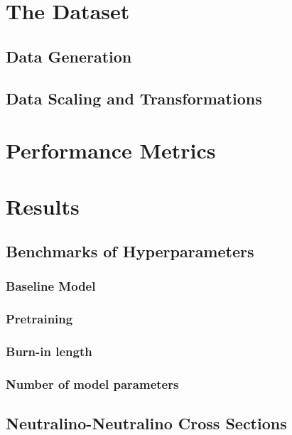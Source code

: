 \section{The Dataset}\label{sec:dataset}
\subsection{Data Generation}
\subsection{Data Scaling and Transformations}
\section{Performance Metrics}\label{seq:perf_metrics}
\section{Results}\label{sec:results}
\subsection{Benchmarks of Hyperparameters}\label{subsec:benchmarks}
\subsubsection{Baseline Model}
\subsubsection{Pretraining}
\subsubsection{Burn-in length}
\subsubsection{Number of model parameters}

\subsection{Neutralino-Neutralino Cross Sections}\label{subsec:neuralino_experiments}

